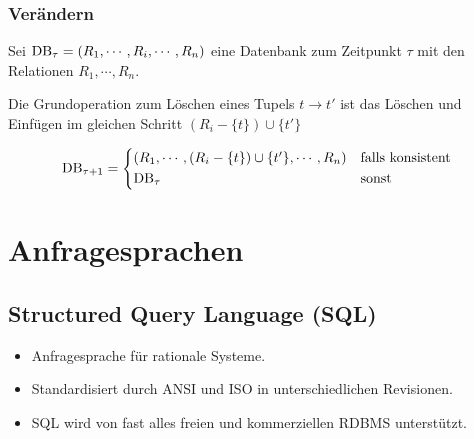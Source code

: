 		\subsection{Verändern} %
			Sei \( \operatorname{DB}_\tau = (R_1, \cdots, R_i, \cdots, R_n) \) eine Datenbank zum Zeitpunkt \(\tau\) mit den Relationen \( R_1, \cdots, R_n \).

			Die Grundoperation zum Löschen eines Tupels \( t \rightarrow t' \) ist das Löschen und Einfügen im gleichen Schritt \( (R_i - \{t\}) \cup \{t'\} \)

			\begin{equation*}
				\DB_{\tau + 1} =
				\begin{cases*}
					(R_1, \cdots, (R_i - \{t\}) \cup \{t'\}, \cdots, R_n) & \text{falls konsistent} \\
					\DB_\tau                                              & \text{sonst}
				\end{cases*}
			\end{equation*}

\chapter{Anfragesprachen} %
	\label{c:sql}

	\section{Structured Query Language (SQL)} %
		\begin{itemize}
			\item Anfragesprache für rationale Systeme.
			\item Standardisiert durch ANSI und ISO in unterschiedlichen Revisionen.
			\item SQL wird von fast alles freien und kommerziellen RDBMS unterstützt.
		\end{itemize}

